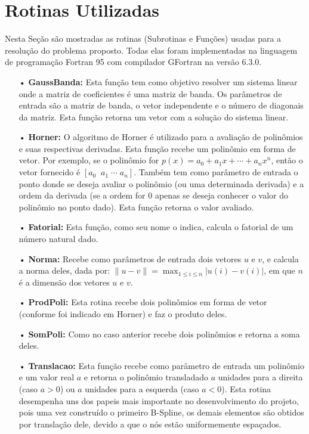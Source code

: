 \documentclass[12pt,a4paper]{report}
\newcommand{\dis}{\displaystyle}
\begin{document}
\section*{Rotinas Utilizadas}
Nesta Seção são mostradas as rotinas (Subrotinas e Funções) usadas para a resolução do problema proposto. Todas elas foram implementadas na linguagem de programação Fortran 95 com compilador GFortran na versão 6.3.0.
\begin{itemize}
\item[•] \textbf{GaussBanda:} Esta função tem como objetivo resolver um sistema linear onde a matriz de coeficientes é uma matriz de banda. Os parâmetros de entrada são a matriz de banda, o vetor independente e o número de diagonais da matriz. Esta função retorna um vetor com a solução do sistema linear.

\item[•] \textbf{Horner:} O algoritmo de Horner é utilizado para a avaliação de polinômios e suas respectivas derivadas. Esta função recebe um polinômio em forma de vetor. Por exemplo, se o polinômio for $p(x)=a_0+a_1x+\cdots +a_nx^n$, então o vetor fornecido é  $[a_0\;\;a_1\;\cdots\; a_n]$. Também tem como parâmetro de entrada o ponto donde se deseja avaliar o polinômio (ou uma determinada derivada) e a ordem da derivada (se a ordem for 0 apenas se deseja conhecer o valor do polinômio no ponto dado). Esta função retorna o valor avaliado.

\item[•] \textbf{Fatorial:} Esta função, como seu nome o indica, calcula o fatorial de um número natural dado.

\item[•] \textbf{Norma:} Recebe como parâmetros de entrada dois vetores $u$ e $v$, e calcula a norma deles, dada por: $\|u-v\|=\dis\max_{1\leq i \leq n}|u(i)-v(i)|$, em que $n$ é a dimensão dos vetores $u$ e $v$.

\item[•] \textbf{ProdPoli:} Esta rotina recebe dois polinômios em forma de vetor (conforme foi indicado em Horner) e faz o produto deles.

\item[•] \textbf{SomPoli:} Como no caso anterior recebe dois polinômios e retorna a soma deles.

\item[•] \textbf{Translacao:} Esta função recebe como parâmetro de entrada um polinômio e um valor real $a$ e retorna o polinômio transladado $a$ unidades para a direita (caso $a>0$) ou $a$ unidades para a esquerda (caso $a<0$). Esta rotina desempenha uns dos papeis mais importante no desenvolvimento do projeto, pois uma vez construído o primeiro B-Spline, os demais elementos são obtidos por translação dele, devido a que o nós estão uniformemente espaçados.


\end{itemize}
\end{document}
